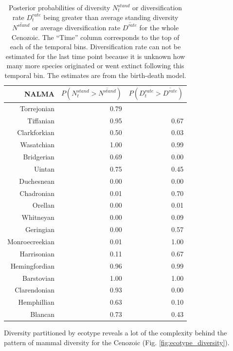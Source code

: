 \documentclass[12pt,letterpaper]{article}
\begin{document}
\begin{table}[ht]
  \centering
  \caption[Posterior probability estimates of a peak in diversity, diversification]{Posterior probabilities of diversity \(N^{stand}_{t}\) or diversification rate \(D^{rate}_{t}\) being greater than average standing diversity \(\overline{N^{stand}}\) or average diversification rate \(\overline{D^{rate}}\) for the whole Cenozoic. The ``Time'' column corresponds to the top of each of the temporal bins. Diversification rate can not be estimated for the last time point because it is unknown how many more species originated or went extinct following this temporal bin. The estimates are from the birth-death model.}
  \label{tab:div_peak}
  \begin{tabular}{ r r r }
    \hline
    NALMA & \(P(N^{stand}_{t} > \overline{N^{stand}})\) & \(P(D^{rate}_{t} > \overline{D^{rate}})\) \\ 
    \hline
    Torrejonian & 0.79 & \\ 
    Tiffanian & 0.95 & 0.67 \\ 
    Clarkforkian & 0.50 & 0.03 \\ 
    Wasatchian & 1.00 & 0.99 \\ 
    Bridgerian & 0.69 & 0.00 \\ 
    Uintan & 0.75 & 0.45 \\ 
    Duchesnean & 0.00 & 0.00 \\ 
    Chadronian & 0.01 & 0.70 \\ 
    Orellan & 0.00 & 0.01 \\ 
    Whitneyan & 0.00 & 0.09 \\ 
    Geringian & 0.00 & 0.57 \\ 
    Monroecreekian & 0.01 & 1.00 \\ 
    Harrisonian & 0.11 & 0.67 \\ 
    Hemingfordian & 0.96 & 0.99 \\ 
    Barstovian & 1.00 & 1.00 \\ 
    Clarendonian & 0.93 & 0.00 \\ 
    Hemphillian & 0.63 & 0.10 \\ 
    Blancan & 0.73 & 0.43 \\ 
    \hline
  \end{tabular}
\end{table}


Diversity partitioned by ecotype reveals a lot of the complexity behind the pattern of mammal diversity for the Cenozoic (Fig. \ref{fig:ecotype_diversity}). 
\end{document}
